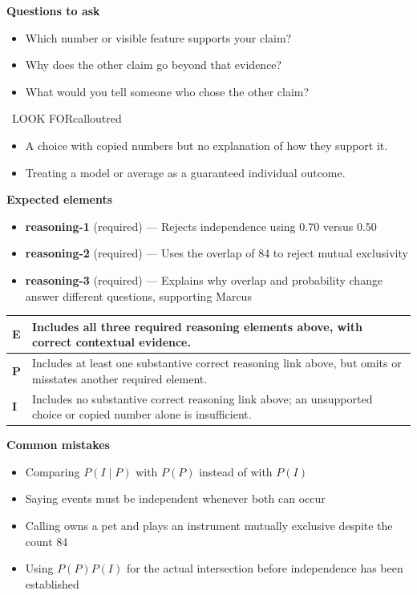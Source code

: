 \documentclass[11pt]{article}
\begin{document}
\textbf{Questions to ask}
\begin{itemize}[leftmargin=1.5em,itemsep=2pt,topsep=2pt]
  \item Which number or visible feature supports your claim?
  \item Why does the other claim go beyond that evidence?
  \item What would you tell someone who chose the other claim?
\end{itemize}

\begin{callout}{\IconWarn\ LOOK FOR}{calloutred}
\begin{itemize}[leftmargin=1.5em,itemsep=2pt,topsep=2pt]
  \item A choice with copied numbers but no explanation of how they support it.
  \item Treating a model or average as a guaranteed individual outcome.
\end{itemize}
\end{callout}


\textbf{Expected elements}
\begin{itemize}[leftmargin=1.5em,itemsep=2pt,topsep=2pt]
  \item \textbf{reasoning-1} (required) --- Rejects independence using 0.70 versus 0.50
  \item \textbf{reasoning-2} (required) --- Uses the overlap of 84 to reject mutual exclusivity
  \item \textbf{reasoning-3} (required) --- Explains why overlap and probability change answer different questions, supporting Marcus
\end{itemize}

{\small\renewcommand{\arraystretch}{1.25}
\noindent\begin{tabular}{|p{0.5in}|p{5.9in}|}
\hline
\textbf{E} & Includes all three required reasoning elements above, with correct contextual evidence. \\ \hline
\textbf{P} & Includes at least one substantive correct reasoning link above, but omits or misstates another required element. \\ \hline
\textbf{I} & Includes no substantive correct reasoning link above; an unsupported choice or copied number alone is insufficient. \\ \hline
\end{tabular}}

\textbf{Common mistakes}
\begin{itemize}[leftmargin=1.5em,itemsep=2pt,topsep=2pt]
  \item Comparing $P(I\mid P)$ with $P(P)$ instead of with $P(I)$
  \item Saying events must be independent whenever both can occur
  \item Calling owns a pet and plays an instrument mutually exclusive despite the count 84
  \item Using $P(P)P(I)$ for the actual intersection before independence has been established
\end{itemize}
\end{document}
